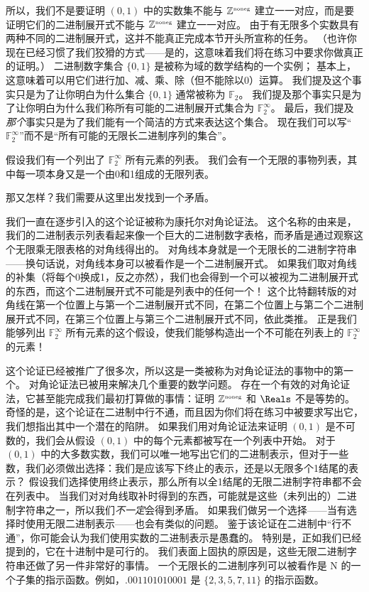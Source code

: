 所以，我们不是要证明 $(0, 1)$ 中的实数集不能与 ${\mathbb Z}^{\mbox{\tiny noneg}}$ 建立一一对应，而是要证明它们的二进制展开式不能与 ${\mathbb Z}^{\mbox{\tiny noneg}}$ 建立一一对应。
由于有无限多个实数具有两种不同的二进制展开式，这并不能真正完成本节开头所宣称的任务。
（也许你现在已经习惯了我们狡猾的方式——是的，这意味着我们将在练习中要求你做真正的证明。）
二进制数字集合 $\{0, 1\}$ 是被称为域的数学结构的一个实例；
基本上，这意味着可以用它们进行加、减、乘、除（但不能除以0）运算。
我们提及这个事实只是为了让你明白为什么集合 $\{0, 1\}$ 通常被称为 ${\mathbb F}_2$。
我们提及那个事实只是为了让你明白为什么我们称所有可能的二进制展开式集合为 ${\mathbb F}_2^\infty$。
最后，我们提及\emph{那个}事实只是为了我们能有一个简洁的方式来表达这个集合。
现在我们可以写“${\mathbb F}_2^\infty$”而不是“所有可能的无限长二进制序列的集合”。

假设我们有一个列出了 ${\mathbb F}_2^\infty$ 所有元素的列表。
我们会有一个无限的事物列表，其中每一项本身又是一个由0和1组成的无限列表。

那又怎样？我们需要从这里出发找到一个矛盾。

我们一直在逐步引入的这个论证被称为康托尔对角论证法。
这个名称的由来是，我们的二进制表示列表看起来像一个巨大的二进制数字表格，而矛盾是通过观察这个无限乘无限表格的对角线得出的。
对角线本身就是一个无限长的二进制字符串——换句话说，对角线本身可以被看作是一个二进制展开式。
如果我们取对角线的补集（将每个0换成1，反之亦然），我们也会得到一个可以被视为二进制展开式的东西，而这个二进制展开式不可能是列表中的任何一个！
这个比特翻转版的对角线在第一个位置上与第一个二进制展开式不同，在第二个位置上与第二个二进制展开式不同，在第三个位置上与第三个二进制展开式不同，依此类推。
正是我们能够列出 ${\mathbb F}_2^\infty$ 所有元素的这个假设，使我们能够构造出一个不可能在列表上的 ${\mathbb F}_2^\infty$ 的元素！

这个论证已经被推广了很多次，所以这是一类被称为对角论证法的事物中的第一个。
对角论证法已被用来解决几个重要的数学问题。
存在一个有效的对角论证法，它甚至能完成我们最初打算做的事情：证明 ${\mathbb Z}^{\mbox{\tiny noneg}}$ 和 $\Reals$ 不是等势的。
奇怪的是，这个论证在二进制中行不通，而且因为你们将在练习中被要求写出它，我们想指出其中一个潜在的陷阱。
如果我们用对角论证法来证明 $(0, 1)$ 是不可数的，我们会从假设 $(0, 1)$ 中的每个元素都被写在一个列表中开始。
对于 $(0, 1)$ 中的大多数实数，我们可以唯一地写出它们的二进制表示，但对于一些数，我们必须做出选择：我们是应该写下终止的表示，还是以无限多个1结尾的表示？
假设我们选择使用终止表示，那么所有以全1结尾的无限二进制字符串都不会在列表中。
当我们对对角线取补时得到的东西，可能就是这些（未列出的）二进制字符串之一，所以我们\emph{不一定}会得到矛盾。
如果我们做另一个选择——当有选择时使用无限二进制表示——也会有类似的问题。
鉴于该论证在二进制中“行不通”，你可能会认为我们使用实数的二进制表示是愚蠢的。
特别是，正如我们已经提到的，它在十进制中是可行的。
我们表面上固执的原因是，这些无限二进制字符串还做了另一件非常好的事情。
一个无限长的二进制序列可以被看作是 N 的一个子集的指示函数。例如，$.001101010001$ 是 $\{2, 3, 5, 7, 11\}$ 的指示函数。

